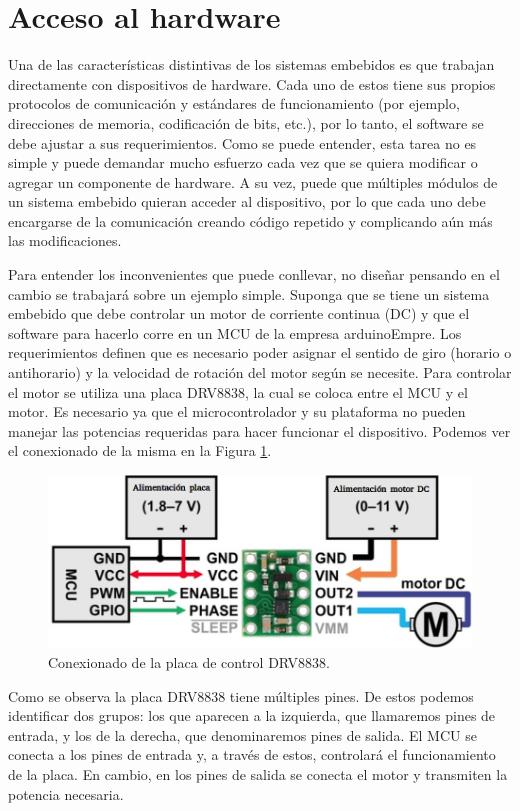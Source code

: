 \minitoc



\section{Acceso al hardware}
\label{Accesoalhardware}
Una de las características distintivas de los sistemas embebidos es que trabajan directamente con dispositivos de hardware. Cada uno de estos tiene sus propios protocolos de comunicación y estándares de funcionamiento (por ejemplo, direcciones de memoria, codificación de bits, etc.), por lo tanto, el software se debe ajustar a sus requerimientos. Como se puede entender, esta tarea no es simple y puede demandar mucho esfuerzo cada vez que se quiera modificar o agregar un componente de hardware. A su vez, puede que múltiples módulos de un sistema embebido quieran acceder al dispositivo, por lo que cada uno debe encargarse de la comunicación creando código repetido y complicando aún más las modificaciones. 

Para entender los inconvenientes que puede conllevar, no diseñar pensando en el cambio se trabajará sobre un ejemplo simple. Suponga que se tiene un sistema embebido que debe controlar un motor de corriente continua (\gls{DC}) y que el software para hacerlo corre en un \gls{MCU} de la empresa \gls{arduinoEmpre}. Los requerimientos definen que es necesario poder asignar el sentido de giro (horario o antihorario) y la velocidad de rotación del motor según se necesite. Para controlar el motor se utiliza una placa \gls{DRV8838}, la cual se coloca entre el \gls{MCU} y el motor. Es necesario ya que el microcontrolador y su plataforma no pueden manejar las potencias requeridas para hacer funcionar el dispositivo. Podemos ver el conexionado de la misma en la Figura \ref{drv8838}.

\begin{figure}[H]
    \centering
    \includegraphics[width=0.6\linewidth]{drv8838.png}
    \caption{Conexionado de la placa de control DRV8838.}
    \label{drv8838}
\end{figure}

Como se observa la placa \gls{DRV8838} tiene múltiples pines. De estos podemos identificar dos grupos: los que aparecen a la izquierda, que llamaremos pines de entrada, y los de la derecha, que denominaremos pines de salida. El \gls{MCU} se conecta a los pines de entrada y, a través de estos, controlará el funcionamiento de la placa. En cambio, en los pines de salida se conecta el motor y transmiten la potencia necesaria.

